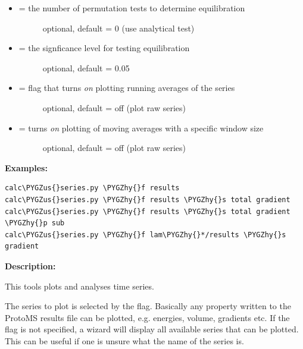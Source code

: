 \documentclass[letterpaper,10pt,english]{sphinxmanual}
\def\PYGZus{\char`\_}
\def\PYGZhy{\char`\-}
\begin{document}
\begin{itemize}
\item {} \begin{description}
\item[{ = the number of permutation tests to determine equilibration}] \leavevmode
optional, default = 0 (use analytical test)

\end{description}

\item {} \begin{description}
\item[{ = the signficance level for testing equilibration}] \leavevmode
optional, default = 0.05

\end{description}

\item {} \begin{description}
\item[{ = flag that turns \emph{on} plotting running averages of the series}] \leavevmode
optional, default = off (plot raw series)

\end{description}

\item {} \begin{description}
\item[{ = turns \emph{on} plotting of moving averages with a specific window size}] \leavevmode
optional, default = off (plot raw series)

\end{description}

\end{itemize}

\textbf{Examples:}

\begin{Verbatim}[commandchars=\\\{\}]
calc\PYGZus{}series.py \PYGZhy{}f results
calc\PYGZus{}series.py \PYGZhy{}f results \PYGZhy{}s total gradient
calc\PYGZus{}series.py \PYGZhy{}f results \PYGZhy{}s total gradient \PYGZhy{}p sub
calc\PYGZus{}series.py \PYGZhy{}f lam\PYGZhy{}*/results \PYGZhy{}s gradient
\end{Verbatim}

\textbf{Description:}

This tools plots and analyses time series.

The series to plot is selected by the  flag. Basically any property written to the ProtoMS results file can be plotted, e.g. energies, volume, gradients etc. If the  flag is not specified, a wizard will display all available series that can be plotted. This can be useful if one is unsure what the name of the series is.
\end{document}
